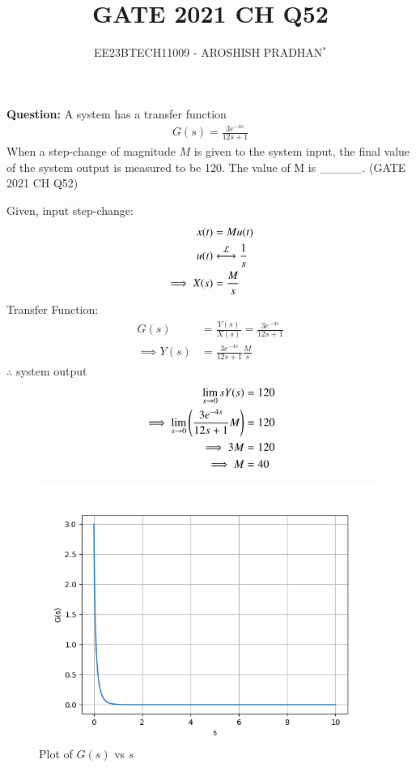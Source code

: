 \documentclass[journal,12pt,twocolumn]{IEEEtran}
\theoremstyle{remark}
\begin{document}

\vspace{3cm}

\title{GATE 2021 CH Q52}
\author{EE23BTECH11009 - AROSHISH PRADHAN$^{*}$%
}
\maketitle
\newpage
\bigskip
\textbf{Question:} A system has a transfer function
\begin{align}
    G(s) = \frac{3e^{-4s}}{12s + 1}\nonumber
\end{align}
When a step-change of magnitude $M$ is given to the system input, the final value of the system output is measured to be 120. The value of M is \_\_\_\_\_.
\hfill(GATE 2021 CH Q52)\\
\solution


Given, input step-change:
\begin{align}
    x(t) &= Mu(t)\\
    u(t) &\system{L} \frac{1}{s}\\
    \implies X(s) &= \frac{M}{s}
\end{align}
Transfer Function:
\begin{align}
    G(s) &= \frac{Y(s)}{X(s)} = \frac{3e^{-4s}}{12s + 1}\\
    \implies Y(s) &= \frac{3e^{-4s}}{12s + 1}\frac{M}{s}
\end{align}
$\therefore$ system output
\begin{align}
     \lim_{s\rightarrow0}sY(s) &= 120\\
    \implies \lim_{s\rightarrow0}\left(\frac{3e^{-4s}}{12s + 1}M\right) &= 120\\
    \implies 3M &= 120\\
    \implies M &= 40
\end{align}

\begin{figure}
    \centering
    \includegraphics[width = \columnwidth]{figs/assign9.png}
	\caption{Plot of $G(s)$ vs $s$}
    \label{fig:1_gate.21.ch.52}
\end{figure}
\end{document}
